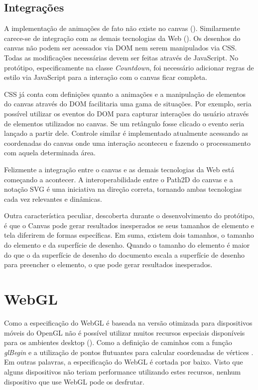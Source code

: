 \subsection{Integrações}

A implementação de animações de fato não existe no canvas
(). Similarmente carece-se de integração
com as demais tecnologias da Web ().
Os desenhos do canvas não podem ser acessados via DOM nem serem
manipulados via CSS. Todas as modificações necessárias devem ser
feitas através de JavaScript. No protótipo, especificamente na classe
\textit{Countdown}, foi necessário adicionar regras de estilo via
JavaScript para a interação com o canvas ficar completa.

CSS já conta com definições quanto a animações e a manipulação de
elementos do canvas através do DOM facilitaria uma gama de situações.
Por exemplo, seria possível utilizar os eventos do DOM para capturar
interações do usuário através de elementos utilizados no canvas.
Se um retângulo fosse clicado o evento seria lançado a partir dele.
Controle similar é implementado atualmente acessando as coordenadas
do canvas onde uma interação aconteceu e fazendo o processamento com
aquela determinada área.

Felizmente a integração entre o canvas e as demais tecnologias da
Web está começando a acontecer. A interoperabilidade entre o Path2D
do canvas e a notação SVG é uma iniciativa na direção correta,
tornando ambas tecnologias cada vez relevantes e dinâmicas.

Outra característica peculiar, descoberta durante o desenvolvimento
do protótipo, é que o Canvas pode gerar resultados inesperados se
seus tamanhos de elemento e tela diferirem de formas específicas. Em
suma, existem dois tamanhos, o tamanho do elemento e da superfície de
desenho. Quando o tamanho do elemento é maior do que o da superfície
de desenho do documento escala a superfície de desenho para preencher o
elemento, o que pode gerar resultados inesperados.

\section{WebGL}

Como a especificação do WebGL é baseada na versão otimizada
para dispositivos móveis do OpenGL não é possível utilizar
muitos recursos especiais disponíveis para os ambientes desktop
(). Como a definição de caminhos
com a função \textit{glBegin} e a utilização de pontos flutuantes
para calcular coordenadas de vértices \autocite{esVsGl}. Em outras
palavras, a especificação do WebGL é cortada por baixo. Visto que
alguns dispositivos não teriam performance utilizando estes recursos,
nenhum dispositivo que use WebGL pode os desfrutar.

